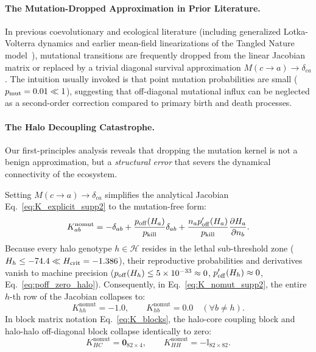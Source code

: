 \documentclass[11pt,a4paper]{article}
\newcommand{\pk}{p_{\rm kill}}
\newcommand{\pmut}{p_{\rm mut}}
\newcommand{\poff}{p_{\rm off}}
\newcommand{\Hc}{H_{\rm crit}}
\begin{document}
\paragraph*{The Mutation-Dropped Approximation in Prior Literature.}
In previous coevolutionary and ecological literature (including generalized Lotka-Volterra dynamics and earlier mean-field linearizations of the Tangled Nature model~\cite{cairoli2014forecasting,barzon2024unraveling}), mutational transitions are frequently dropped from the linear Jacobian matrix or replaced by a trivial diagonal survival approximation $M(c \to a) \to \delta_{ca}$. The intuition usually invoked is that point mutation probabilities are small ($\pmut = 0.01 \ll 1$), suggesting that off-diagonal mutational influx can be neglected as a second-order correction compared to primary birth and death processes.

\paragraph*{The Halo Decoupling Catastrophe.}
Our first-principles analysis reveals that dropping the mutation kernel is not a benign approximation, but a \emph{structural error} that severs the dynamical connectivity of the ecosystem.

Setting $M(c \to a) \to \delta_{ca}$ simplifies the analytical Jacobian Eq.~\eqref{eq:K_explicit_supp2} to the mutation-free form:
\begin{equation}
K_{ab}^{\mathrm{nomut}} = -\delta_{ab} + \frac{\poff(H_a)}{\pk} \delta_{ab} + \frac{n_a \poff'(H_a)}{\pk} \frac{\partial H_a}{\partial n_b}.
\label{eq:K_nomut_supp2}
\end{equation}
Because every halo genotype $h \in \mathcal{H}$ resides in the lethal sub-threshold zone ($H_h \le -74.4 \ll \Hc = -1.386$), their reproductive probabilities and derivatives vanish to machine precision ($\poff(H_h) \le 5 \times 10^{-33} \approx 0$, $\poff'(H_h) \approx 0$, Eq.~\eqref{eq:poff_zero_halo}). Consequently, in Eq.~\eqref{eq:K_nomut_supp2}, the entire $h$-th row of the Jacobian collapses to:
\begin{equation}
K_{hh}^{\mathrm{nomut}} = -1.0, \qquad K_{hb}^{\mathrm{nomut}} = 0.0 \quad (\forall b \neq h).
\end{equation}
In block matrix notation Eq.~\eqref{eq:K_blocks}, the halo-core coupling block and halo-halo off-diagonal block collapse identically to zero:
\begin{equation}
K_{HC}^{\mathrm{nomut}} = \mathbf{0}_{82 \times 4}, \qquad K_{HH}^{\mathrm{nomut}} = -\mathbb{I}_{82 \times 82}.
\end{equation}
\end{document}
